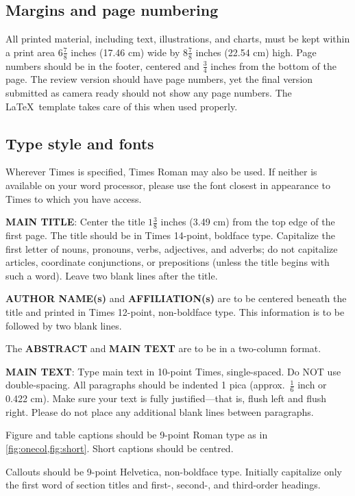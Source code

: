 \documentclass[10pt,twocolumn,letterpaper]{article}
\begin{document}
\subsection{Margins and page numbering}

All printed material, including text, illustrations, and charts, must be kept within a print area $6\frac{7}{8}$ inches (17.46 cm) wide by $8\frac{7}{8}$ inches (22.54 cm) high. Page numbers should be in the footer, centered and $\frac{3}{4}$ inches from the bottom of the page. The review version should have page numbers, yet the final version submitted as camera ready should not show any page numbers. The \LaTeX\ template takes care of this when used properly.


\subsection{Type style and fonts}

Wherever Times is specified, Times Roman may also be used. If neither is available on your word processor, please use the font closest in appearance to Times to which you have access.

\textbf{MAIN TITLE}: Center the title $1\frac{3}{8}$ inches (3.49 cm) from the top edge of the first page. The title should be in Times 14-point, boldface type. Capitalize the first letter of nouns, pronouns, verbs, adjectives, and adverbs; do not capitalize articles, coordinate conjunctions, or prepositions (unless the title begins with such a word). Leave two blank lines after the title.

\textbf{AUTHOR NAME(s)} and \textbf{AFFILIATION(s)} are to be centered beneath the title and printed in Times 12-point, non-boldface type. This information is to be followed by two blank lines.

The \textbf{ABSTRACT} and \textbf{MAIN TEXT} are to be in a two-column format.

\textbf{MAIN TEXT}: Type main text in 10-point Times, single-spaced. Do NOT use double-spacing. All paragraphs should be indented 1 pica (approx.~$\frac{1}{6}$ inch or 0.422 cm). Make sure your text is fully justified---that is, flush left and flush right. Please do not place any additional blank lines between paragraphs.

Figure and table captions should be 9-point Roman type as in \cref{fig:onecol,fig:short}. Short captions should be centred.

\noindent Callouts should be 9-point Helvetica, non-boldface type. Initially capitalize only the first word of section titles and first-, second-, and third-order headings.
\end{document}
